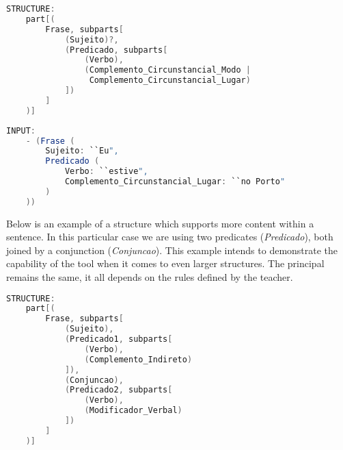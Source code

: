 \begin{center}
\begin{minipage}{14cm}
\begin{lstlisting}[language=java, basicstyle=\small, label={lst:example_structure4}, caption=Example of a sentence structure]
STRUCTURE:
    part[(
        Frase, subparts[
            (Sujeito)?,
            (Predicado, subparts[
                (Verbo),
                (Complemento_Circunstancial_Modo | 
                 Complemento_Circunstancial_Lugar)
            ])
        ]
    )]
\end{lstlisting}
\end{minipage}
\end{center}

\begin{center}
\begin{minipage}{14cm}
\begin{lstlisting}[language=java, basicstyle=\small, label={lst:example_input4}, caption=Example of a sentence input]
INPUT:
    - (Frase (
        Sujeito: ``Eu",
        Predicado (
            Verbo: ``estive",
            Complemento_Circunstancial_Lugar: ``no Porto"
        )
    ))
\end{lstlisting}
\end{minipage}
\end{center}


Below is an example of a structure which supports more content within a sentence.
In this particular case we are using two predicates (\textit{Predicado}), both joined by a conjunction (\textit{Conjuncao}).
This example intends to demonstrate the capability of the tool when it comes to even larger structures.
The principal remains the same, it all depends on the rules defined by the teacher.

\begin{center}
\begin{minipage}{10cm}
\begin{lstlisting}[language=java, basicstyle=\tiny, label={lst:example_complex_structure}, caption=Example of a more complex structure]
STRUCTURE:
    part[(
        Frase, subparts[
            (Sujeito),
            (Predicado1, subparts[
                (Verbo),
                (Complemento_Indireto)
            ]),
            (Conjuncao),
            (Predicado2, subparts[
                (Verbo),
                (Modificador_Verbal)
            ])
        ]
    )]
\end{lstlisting}
\end{minipage}
\end{center}

